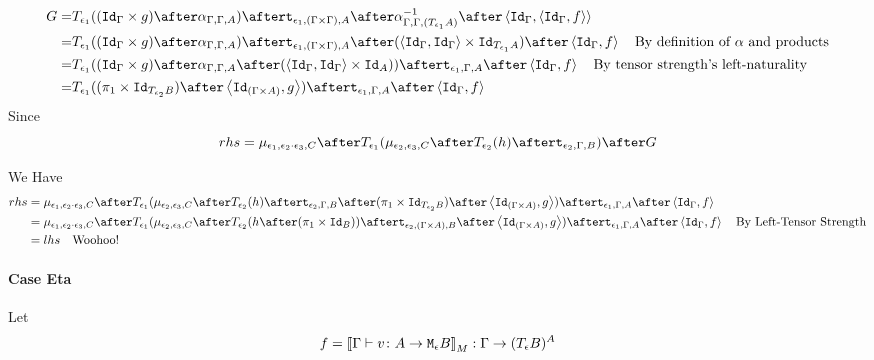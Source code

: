 {    \begin{equation}
        \begin{split}
            G = & \T{\e_1}{((\idg\times g)\after \alpha_{\G, \G, A})} \after \tstrength{\e_1}{(\G\times\G)}{A}\after\alpha^{-1}_{\G, \G, (\T{\e_1}{A})}\after\pr{\idg}{\pr{\idg}{f}} \\
            = & \T{\e_1}{((\idg\times g)\after \alpha_{\G, \G, A})} \after \tstrength{\e_1}{(\G\times\G)}{A}\after(\pr{\idg}{\idg}\times \Id{\T{\e_1}{A}})\after\pr{\idg}{f}\qt{By definition of $\alpha$ and products}\\
            = & \T{\e_1}{((\idg\times g)\after \alpha_{\G, \G, A}\after(\pr{\idg}{\idg}\times \Id{A}))}\after\tstrength{\e_1}{\G}{A}\after\pr{\idg}{f}\qt{By tensor strength's left-naturality}\\
            = & \T{\e_1}{((\p\times\Id{\T{\e_2}{B}})\after\pr{\Id{(\G\times A)}}{g})}\after\tstrength{\e_1}{\G}{A}\after\pr{\idg}{f}
        \end{split}
    \end{equation}
Since 
\begin{equation}
    rhs = \bind{\e_1}{\e_2\dot\e_3}{C}\after\T{\e_1}{(\bind{\e_2}{\e_3}{C}\after \T{\e_2}{(h)} \after \tstrength{\e_2}{\G}{B})}\after G
\end{equation}

We Have
\begin{equation}
    \begin{split}
        rhs ={} & \bind{\e_1}{\e_2\dot\e_3}{C}\after\T{\e_1}{(\bind{\e_2}{\e_3}{C}\after \T{\e_2}{(h)} \after \tstrength{\e_2}{\G}{B}\after(\p\times\Id{\T{\e_2}{B}})\after\pr{\Id{(\G\times A)}}{g})}\after\tstrength{\e_1}{\G}{A}\after\pr{\idg}{f}\\
        ={} & \bind{\e_1}{\e_2\dot\e_3}{C}\after\T{\e_1}{(\bind{\e_2}{\e_3}{C}\after \T{\e_2}{(h \after (\p\times\Id{B}))}\after\tstrength{\e_2}{(\G\times A)}{B}\after\pr{\Id{(\G\times A)}}{g})}\after\tstrength{\e_1}{\G}{A}\after\pr{\idg}{f}\qt{By Left-Tensor Strength}\\
        ={} & lhs \qt{Woohoo!}
    \end{split}
\end{equation}


    \paragraph{Case Eta}
    Let 
    \begin{equation}
        f = {\bf [\![}\Gamma \vdash v \colon A \rightarrow \texttt{M}_{\epsilon}{B}{\bf ]\!]}_M : \Gamma \rightarrow (T_{\epsilon}{B})^{A}
    \end{equation}

}
